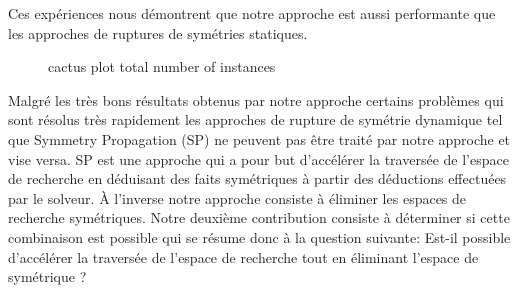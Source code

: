 Ces expériences nous démontrent que notre approche est aussi performante que les approches de ruptures de symétries statiques.
\begin{figure}[!htbp]
 \centering
 \qquad
 \caption{cactus plot  total number of instances}%
 \label{fig:frcactus}%
\end{figure}

Malgré les très bons résultats obtenus par notre approche certains problèmes qui sont résolus très 
rapidement les approches de rupture de symétrie dynamique tel que  Symmetry Propagation (SP) ne peuvent pas être traité par notre approche et vise versa.
SP est une approche qui a pour but d'accélérer la traversée de l'espace de recherche en déduisant des faits symétriques à partir des déductions effectuées par le solveur.
 À l'inverse notre approche consiste à éliminer les espaces de recherche 
symétriques. %
Notre deuxième contribution consiste à déterminer si cette combinaison est possible qui se résume donc à la question suivante:
Est-il possible d'accélérer la traversée de l'espace de recherche tout en éliminant l'espace de symétrique ?

